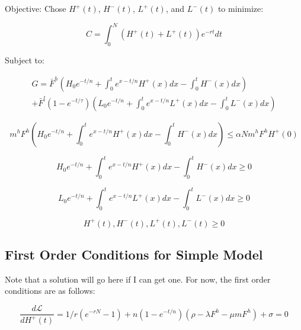\documentclass{article}
\newcommand{\Lagr}{\mathcal{L}}
\begin{document}
Objective: Chose $H^+(t)$, $H^-(t)$, $L^+(t)$, and $L^-(t)$ to minimize:

\begin{equation}\label{eq:analyticalObj}
C = \int_0^N (H^+(t) + L^+(t))e^{-rt} dt
\end{equation}

Subject to: 

\begin{multline}\label{eq:analyticalGen}
G = \bar{F}^h\left (H_0 e^{-t/n} + \int_0^t e^{x-t/n} H^+(x) dx - \int_0^t H^-(x)dx \right) \\ + \bar{F}^l(1-e^{-t/\tau}) \left ( L_0 e^{-t/n} + \int_0^t e^{x-t/n} L^+(x) dx - \int_0^t L^-(x)dx\right )
\end{multline}

\begin{equation}\label{eq:analyticalEmit}
m^hF^h\left (H_0 e^{-t/n} + \int_0^t e^{x-t/n} H^+(x) dx - \int_0^t H^-(x)dx \right) \leq \alpha N m^h F^h H^+(0)
\end{equation}

\begin{equation}\label{eq:analyticalHCapConstraint}
H_0 e^{-t/n} + \int_0^t e^{x-t/n} H^+(x) dx - \int_0^t H^-(x)dx \geq 0 
\end{equation}

\begin{equation}\label{eq:analyticalLCapConstraint}
L_0 e^{-t/n} + \int_0^t e^{x-t/n} L^+(x) dx - \int_0^t L^-(x)dx \geq 0 
\end{equation}

\begin{equation}\label{eq:analyticalDecisionVarConstraint}
H^+(t), H^-(t), L^+(t), L^-(t) \geq 0
\end{equation}


\subsection{First Order Conditions for Simple Model}

Note that a solution will go here if I can get one. For now, the first order conditions are as follows:

\begin{equation}\label{eq:dLdH+}
\frac{d\Lagr}{dH^+(t)} = 1/r(e^{-rN} -1) + n(1-e^{-t/n})(\rho - \lambda F^h -\mu m F^h) + \sigma = 0
\end{equation}
\end{document}
